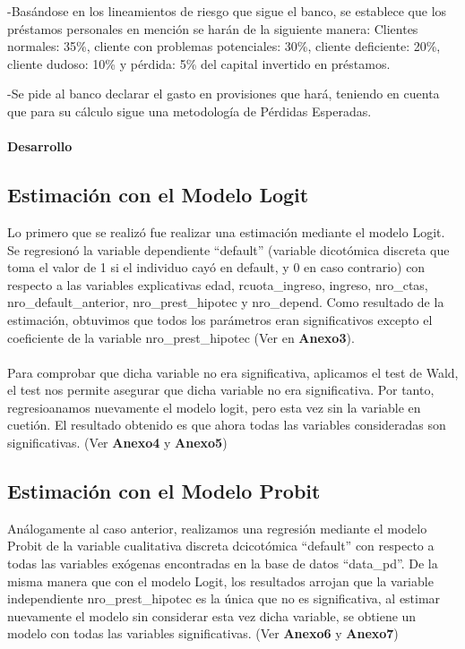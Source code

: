 \documentclass[11pt,fleqn]{book} %
\numberwithin{equation}{section} %
\numberwithin{figure}{section} %
\numberwithin{table}{section} %
\begin{document}
-Basándose en los lineamientos de riesgo que sigue el banco, se establece que los préstamos personales en mención se harán de la siguiente manera:
Clientes normales: 35\%, cliente con problemas potenciales: 30\%, cliente deficiente: 20\%, cliente dudoso: 10\% y pérdida: 5\% del capital invertido en préstamos.

-Se pide al banco declarar el gasto en provisiones que hará, teniendo en cuenta que para su cálculo sigue una metodología de Pérdidas Esperadas.
\\\\

\textbf{Desarrollo}

\subsection{Estimación con el Modelo Logit}

Lo primero que se realizó fue realizar una estimación mediante el modelo Logit. Se regresionó la variable dependiente ``default'' (variable dicotómica discreta que toma el valor de 1 si el individuo cayó en default, y 0 en caso contrario) con respecto a las variables explicativas edad, rcuota\_ingreso, ingreso, nro\_ctas, nro\_default\_anterior, nro\_prest\_hipotec y nro\_depend. Como resultado de la estimación, obtuvimos que todos los parámetros eran significativos excepto el coeficiente de la variable nro\_prest\_hipotec (Ver en \textbf{Anexo3}).
\\\\
Para comprobar que dicha variable no era significativa, aplicamos el test de Wald, el test nos permite asegurar que dicha variable no era significativa. Por tanto, regresioanamos nuevamente el modelo logit, pero esta vez sin la variable en cuetión. El resultado obtenido es que ahora todas las variables consideradas son significativas. (Ver \textbf{Anexo4} y \textbf{Anexo5})

\subsection{Estimación con el Modelo Probit}
Análogamente al caso anterior, realizamos una regresión mediante el modelo Probit de la variable cualitativa discreta dcicotómica ``default'' con respecto a todas las variables exógenas encontradas en la base de datos ``data\_pd''. De la misma manera que con el modelo Logit, los resultados arrojan que la variable independiente nro\_prest\_hipotec es la única que no es significativa, al estimar nuevamente el modelo sin considerar esta vez dicha variable, se obtiene un modelo con todas las variables significativas. (Ver \textbf{Anexo6} y \textbf{Anexo7}) 
\end{document}
